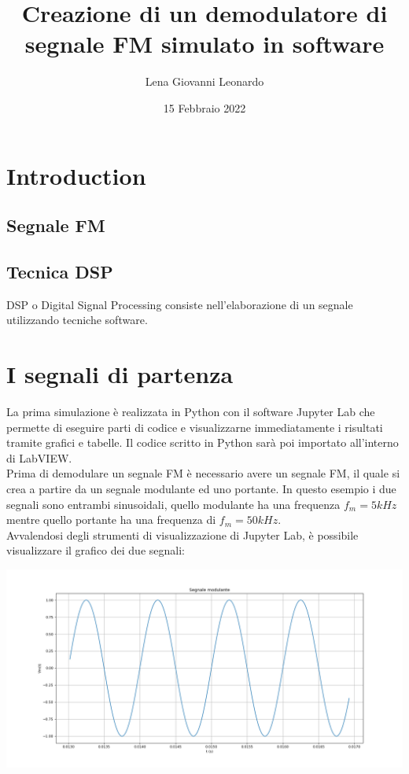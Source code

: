 \documentclass{article}
\title{Creazione di un demodulatore di segnale FM simulato in software}
\author{Lena Giovanni Leonardo}
\date{15 Febbraio 2022}
\begin{document}
\maketitle

\section{Introduction}

\subsection{Segnale FM}

\subsection{Tecnica DSP}
DSP o Digital Signal Processing consiste nell'elaborazione di un segnale utilizzando tecniche software.

\section{I segnali di partenza}
La prima simulazione è realizzata in Python con il software Jupyter Lab che permette di eseguire 
parti di codice e visualizzarne immediatamente i risultati tramite grafici e tabelle. Il codice 
scritto in Python sarà poi importato all'interno di LabVIEW.
\\
Prima di demodulare un segnale FM è necessario avere un segnale FM, il quale si crea a partire da un segnale 
modulante ed uno portante. In questo esempio i due segnali sono entrambi sinusoidali, quello modulante ha una 
frequenza $f_m = 5 kHz$ mentre quello portante ha una frequenza di $f_m = 50 kHz$.
\\
Avvalendosi degli strumenti di visualizzazione di Jupyter Lab, è possibile visualizzare il grafico dei due segnali:
\\
\begin{center}
    \includegraphics[width=\textwidth]{modulante.png}
\end{center}
\end{document}
